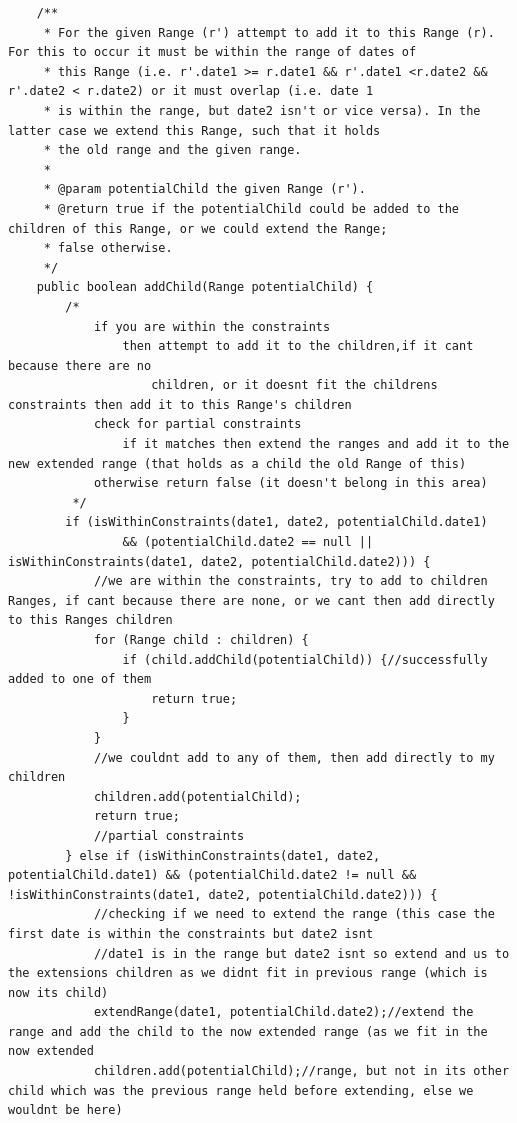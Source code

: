 \begin{lstlisting}
    /**
     * For the given Range (r') attempt to add it to this Range (r). For this to occur it must be within the range of dates of
     * this Range (i.e. r'.date1 >= r.date1 && r'.date1 <r.date2 && r'.date2 < r.date2) or it must overlap (i.e. date 1
     * is within the range, but date2 isn't or vice versa). In the latter case we extend this Range, such that it holds
     * the old range and the given range.
     *
     * @param potentialChild the given Range (r').
     * @return true if the potentialChild could be added to the children of this Range, or we could extend the Range;
     * false otherwise.
     */
    public boolean addChild(Range potentialChild) {
        /*
            if you are within the constraints
                then attempt to add it to the children,if it cant because there are no
                    children, or it doesnt fit the childrens constraints then add it to this Range's children
            check for partial constraints
                if it matches then extend the ranges and add it to the new extended range (that holds as a child the old Range of this)
            otherwise return false (it doesn't belong in this area)
         */
        if (isWithinConstraints(date1, date2, potentialChild.date1)
                && (potentialChild.date2 == null || isWithinConstraints(date1, date2, potentialChild.date2))) {
            //we are within the constraints, try to add to children Ranges, if cant because there are none, or we cant then add directly to this Ranges children
            for (Range child : children) {
                if (child.addChild(potentialChild)) {//successfully added to one of them
                    return true;
                }
            }
            //we couldnt add to any of them, then add directly to my children
            children.add(potentialChild);
            return true;
            //partial constraints
        } else if (isWithinConstraints(date1, date2, potentialChild.date1) && (potentialChild.date2 != null && !isWithinConstraints(date1, date2, potentialChild.date2))) {
            //checking if we need to extend the range (this case the first date is within the constraints but date2 isnt
            //date1 is in the range but date2 isnt so extend and us to the extensions children as we didnt fit in previous range (which is now its child)
            extendRange(date1, potentialChild.date2);//extend the range and add the child to the now extended range (as we fit in the now extended
            children.add(potentialChild);//range, but not in its other child which was the previous range held before extending, else we wouldnt be here)

\end{lstlisting}
